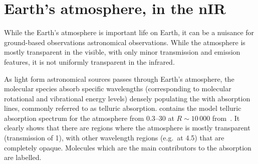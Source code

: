 
\section{Earth's atmosphere, in the nIR}

While the Earth's atmosphere is important life on Earth, it can be a nuisance for ground-based observations astronomical observations.
While the atmosphere is mostly transparent in the visible, with only minor transmission and emission features, it is not uniformly transparent in the infrared.

As light form astronomical sources passes through Earth's atmosphere, the molecular species absorb specific wavelengths (corresponding to molecular rotational and vibrational energy levels) densely populating the \nir{} with absorption lines, commonly referred to as telluric absorption.
 contains the model telluric absorption spectrum for the atmosphere from 0.3--30\um{} at $R\sim10\,000$ from~\citet{smette_molecfit_2015}.
It clearly shows that there are regions where the atmosphere is mostly transparent (transmission of 1), with other wavelength regions (e.g.\ at 4.5\um{}) that are completely opaque.
Molecules which are the main contributors to the absorption are labelled.

